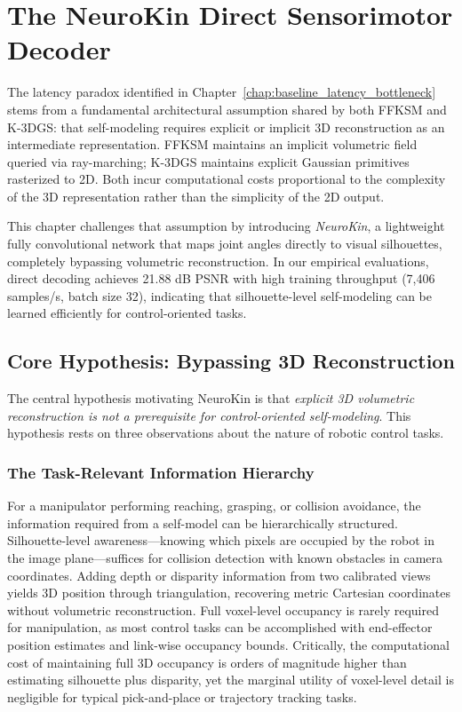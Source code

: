 \documentclass[12pt,a4paper,oneside]{report}
\begin{document}
\chapter{The NeuroKin Direct Sensorimotor Decoder}
\label{chap:neurokin_decoder}

The latency paradox identified in Chapter~\ref{chap:baseline_latency_bottleneck} stems from a fundamental architectural assumption shared by both FFKSM and K-3DGS: that self-modeling requires explicit or implicit 3D reconstruction as an intermediate representation. FFKSM maintains an implicit volumetric field queried via ray-marching; K-3DGS maintains explicit Gaussian primitives rasterized to 2D. Both incur computational costs proportional to the complexity of the 3D representation rather than the simplicity of the 2D output.

This chapter challenges that assumption by introducing \textit{NeuroKin}, a lightweight fully convolutional network that maps joint angles directly to visual silhouettes, completely bypassing volumetric reconstruction. In our empirical evaluations, direct decoding achieves 21.88 dB PSNR with high training throughput (7,406 samples/s, batch size 32), indicating that silhouette-level self-modeling can be learned efficiently for control-oriented tasks.

\section{Core Hypothesis: Bypassing 3D Reconstruction}

The central hypothesis motivating NeuroKin is that \textit{explicit 3D volumetric reconstruction is not a prerequisite for control-oriented self-modeling}. This hypothesis rests on three observations about the nature of robotic control tasks.

\subsection{The Task-Relevant Information Hierarchy}
\label{subsec:the_task_relevant_information_hierarchy}

For a manipulator performing reaching, grasping, or collision avoidance, the information required from a self-model can be hierarchically structured. Silhouette-level awareness—knowing which pixels are occupied by the robot in the image plane—suffices for collision detection with known obstacles in camera coordinates. Adding depth or disparity information from two calibrated views yields 3D position through triangulation, recovering metric Cartesian coordinates without volumetric reconstruction. Full voxel-level occupancy is rarely required for manipulation, as most control tasks can be accomplished with end-effector position estimates and link-wise occupancy bounds. Critically, the computational cost of maintaining full 3D occupancy is orders of magnitude higher than estimating silhouette plus disparity, yet the marginal utility of voxel-level detail is negligible for typical pick-and-place or trajectory tracking tasks.
\end{document}
